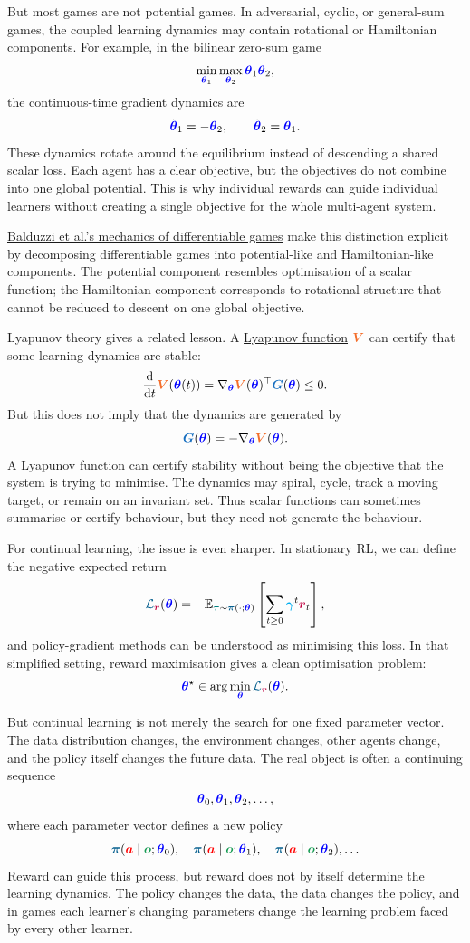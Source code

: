 \documentclass{article}
\newcommand{\colsym}[2]{\ensuremath{\textcolor{#1}{\boldsymbol{#2}}}}
\newcommand{\action}{\colsym{red}{a}}
\newcommand{\obs}{\colsym{ForestGreen}{o}}
\newcommand{\reward}{\colsym{purple}{r}}
\newcommand{\params}{\colsym{blue}{\theta}}
\newcommand{\policy}{\colsym{MidnightBlue}{\pi}}
\newcommand{\trajectory}{\colsym{teal}{\tau}}
\newcommand{\loss}{\ensuremath{\textcolor{MidnightBlue}{\mathcal{L}}}}
\newcommand{\learnfield}{\colsym{RoyalBlue}{G}}
\newcommand{\lyap}{\colsym{Orange}{V}}
\newcommand{\discount}{\colsym{cyan}{\gamma}}
\newcommand{\E}{\mathbb{E}}
\newcommand{\dd}{\mathrm{d}}
\begin{document}
But most games are not potential games. In adversarial, cyclic, or general-sum games, the coupled learning dynamics may contain rotational or Hamiltonian components. For example, in the bilinear zero-sum game
\[
\min_{\params_1}\max_{\params_2}
\params_1\params_2,
\]
the continuous-time gradient dynamics are
\[
\dot{\params}_1=-\params_2,
\qquad
\dot{\params}_2=\params_1.
\]
These dynamics rotate around the equilibrium instead of descending a shared scalar loss. Each agent has a clear objective, but the objectives do not combine into one global potential. This is why individual rewards can guide individual learners without creating a single objective for the whole multi-agent system.

\href{https://proceedings.mlr.press/v80/balduzzi18a.html}{Balduzzi et al.'s mechanics of differentiable games}
make this distinction explicit by decomposing differentiable games into potential-like and Hamiltonian-like components. The potential component resembles optimisation of a scalar function; the Hamiltonian component corresponds to rotational structure that cannot be reduced to descent on one global objective.

Lyapunov theory gives a related lesson. A
\href{https://en.wikipedia.org/wiki/Lyapunov_function}{Lyapunov function}
\lyap{} can certify that some learning dynamics are stable:
\[
\frac{\dd}{\dd t}\lyap(\params(t))
=
\nabla_{\params}\lyap(\params)^{\top}\learnfield(\params)
\le 0.
\]
But this does not imply that the dynamics are generated by
\[
\learnfield(\params)
=
-\nabla_{\params}\lyap(\params).
\]
A Lyapunov function can certify stability without being the objective that the system is trying to minimise. The dynamics may spiral, cycle, track a moving target, or remain on an invariant set. Thus scalar functions can sometimes summarise or certify behaviour, but they need not generate the behaviour.

For continual learning, the issue is even sharper. 
In stationary RL, we can define the negative expected return
\[
\loss_{\reward}(\params)
=
-
\E_{\trajectory\sim \policy(\cdot;\params)}
\left[
\sum_{t\ge 0}\discount^t \reward_t
\right],
\]
and policy-gradient methods can be understood as minimising this loss. In that simplified setting, reward maximisation gives a clean optimisation problem:
\[
\params^\star
\in
\arg\min_{\params}\loss_{\reward}(\params).
\]

But continual learning is not merely the search for one fixed parameter vector. The data distribution changes, the environment changes, other agents change, and the policy itself changes the future data. The real object is often a continuing sequence
\[
\params_0,\params_1,\params_2,\ldots,
\]
where each parameter vector defines a new policy
\[
\policy(\action\mid\obs;\params_0),
\quad
\policy(\action\mid\obs;\params_1),
\quad
\policy(\action\mid\obs;\params_2),
\ldots
\]
Reward can guide this process, but reward does not by itself determine the learning dynamics. The policy changes the data, the data changes the policy, and in games each learner's changing parameters change the learning problem faced by every other learner.
\end{document}
